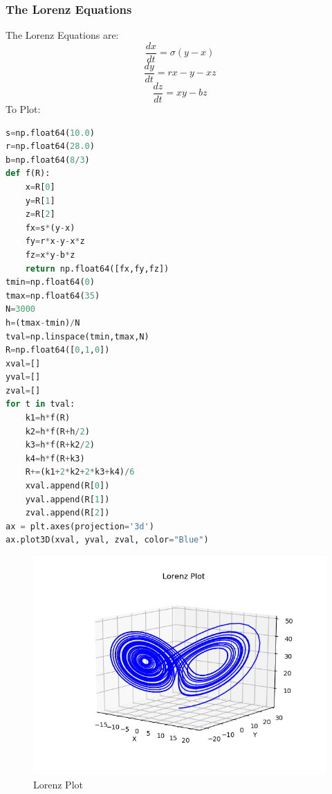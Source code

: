 \subsubsection{The Lorenz Equations}
The Lorenz Equations are:
$$\dfrac{dx}{dt}=\sigma(y-x)$$$$\dfrac{dy}{dt}=rx-y-xz$$$$\dfrac{dz}{dt}=xy-bz$$
To Plot:
\begin{lstlisting}[language=Python, caption=Lorenz Plotter, frame=single, label={lst:Lorenz} ]
s=np.float64(10.0)
r=np.float64(28.0)
b=np.float64(8/3)
def f(R):
	x=R[0]
	y=R[1]
	z=R[2]
	fx=s*(y-x)
	fy=r*x-y-x*z
	fz=x*y-b*z
	return np.float64([fx,fy,fz])
tmin=np.float64(0)
tmax=np.float64(35)
N=3000
h=(tmax-tmin)/N
tval=np.linspace(tmin,tmax,N)
R=np.float64([0,1,0])
xval=[]
yval=[]
zval=[]
for t in tval:
	k1=h*f(R)
	k2=h*f(R+h/2)
	k3=h*f(R+k2/2)
	k4=h*f(R+k3)
	R+=(k1+2*k2+2*k3+k4)/6
	xval.append(R[0])
	yval.append(R[1])
	zval.append(R[2])
ax = plt.axes(projection='3d')
ax.plot3D(xval, yval, zval, color="Blue")

\end{lstlisting}
\begin{figure}[H]
	\centering
	\includegraphics[width=0.9\linewidth]{LorenzPlot}
	\caption{Lorenz Plot}
	\label{fig:lorenzplot}
\end{figure}


